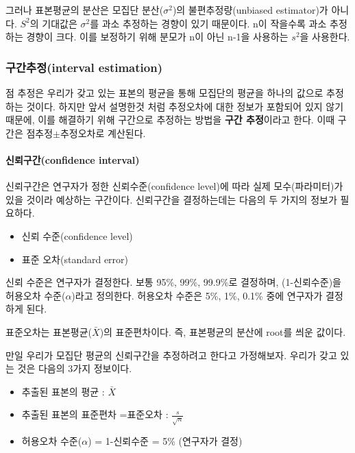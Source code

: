 \documentclass[
]{book}
\providecommand{\tightlist}{%
  \setlength{\itemsep}{0pt}\setlength{\parskip}{0pt}}
\begin{document}
그러나 표본평균의 분산은 모집단 분산(\(\sigma^2\))의 불편추정량(unbiased estimator)가 아니다. \(S^2\)의 기대값은 \(\sigma^2\)를 과소 추정하는 경향이 있기 때문이다. n이 작을수록 과소 추정하는 경향이 크다. 이를 보정하기 위해 분모가 n이 아닌 n-1을 사용하는 \(s^2\)을 사용한다.

\subsubsection{구간추정(interval estimation)}\label{uxad6cuxac04uxcd94uxc815interval-estimation}

점 추정은 우리가 갖고 있는 표본의 평균을 통해 모집단의 평균을 하나의 값으로 추정하는 것이다. 하지만 앞서 설명한것 처럼 추정오차에 대한 정보가 포함되어 있지 않기 때문에, 이를 해결하기 위해 구간으로 추정하는 방법을 \textbf{구간 추정}이라고 한다. 이때 구간은 점추정\(\pm\)추정오차로 계산된다.

\paragraph{신뢰구간(confidence interval)}\label{uxc2e0uxb8b0uxad6cuxac04confidence-interval}

신뢰구간은 연구자가 정한 신뢰수준(confidence level)에 따라 실제 모수(파라미터)가 있을 것이라 예상하는 구간이다. 신뢰구간을 결정하는데는 다음의 두 가지의 정보가 필요하다.

\begin{itemize}
\tightlist
\item
  신뢰 수준(confidence level)
\item
  표준 오차(standard error)
\end{itemize}

신뢰 수준은 연구자가 결정한다. 보통 95\%, 99\%, 99.9\%로 결정하며, (1-신뢰수준)을 허용오차 수준(\(\alpha\))라고 정의한다. 허용오차 수준은 5\%, 1\%, 0.1\% 중에 연구자가 결정하게 된다.

표준오차는 표본평균(\(\bar{X}\))의 표준편차이다. 즉, 표본평균의 분산에 root를 씌운 값이다.

만일 우리가 모집단 평균의 신뢰구간을 추정하려고 한다고 가정해보자. 우리가 갖고 있는 것은 다음의 3가지 정보이다.

\begin{itemize}
\tightlist
\item
  추출된 표본의 평균 : \(\bar{X}\)
\item
  추출된 표본의 표준편차 =표준오차 : \(\frac{s}{\sqrt{n}}\)
\item
  허용오차 수준(\(\alpha\)) = 1-신뢰수준 = 5\% (연구자가 결정)
\end{itemize}
\end{document}
